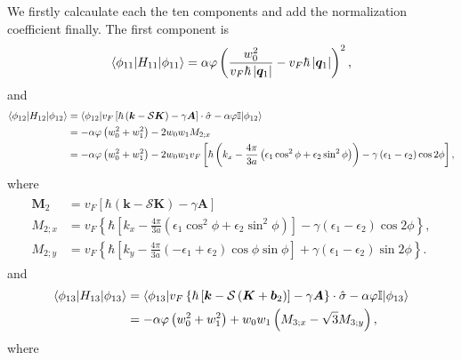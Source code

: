\documentclass[10pt, oneside]{article}
\newcommand{\vph}{\varphi}
\newcommand{\p}[1]{\left(#1\right)}
\newcommand{\bb}[1]{\left[#1\right]}
\newcommand{\br}[1]{\left\{#1\right\}}
\newcommand{\bv}[1]{\left|#1\right|}
\begin{document}
We firstly calcaulate each the ten components and add the normalization coefficient finally. The first component is
\begin{align}
	\begin{split}
		\braket{\phi_{11} | H_{11} | \phi_{11}} = \alpha \vph \p{\frac{w_0^{2}}{v_{F} \hbar \bv{\bm{q}_1}} - v_F \hbar \bv{\bm{q}_{1}}}^2,
	\end{split}
\end{align}
and 
\begin{align}
	\begin{split}
		\braket{\phi_{12} | H_{12} | \phi_{12}} & = \braket{\phi_{12} | v_{F} \bb{\hbar \p{\bm{k} - \mathcal{S} \bm{K}} - \gamma \bm{A}} \cdot \hat{\sigma}  - \alpha \vph \mathbb{I}| \phi_{12}} \\
		& = - \alpha \vph \p{w_0^2 + w_1^2} -2 w_0 w_1 M_{2;x} \\
		& = - \alpha \vph \p{w_{0}^2 + w_{1}^{2}} - 2 w_0 w_1 v_F \bb{\hbar \p{k_{x} - \frac{4 \pi}{3 a} \p{\epsilon_{1} \cos^{2} \phi + \epsilon_{2} \sin^{2} \phi }} - \gamma \p{\epsilon_{1} - \epsilon_{2}} \cos{2 \phi}},
	\end{split}
\end{align}
where 
\begin{align}
	\begin{split}
		\bm{M}_{2} & = v_{F} \bb{\hbar \p{\bm{k} - \mathcal{S} \bm{K}} - \gamma \bm{A}} \\
		M_{2;x} & = v_{F} \br{\hbar \bb{k_{x} - \frac{4 \pi}{3 a} \p{\epsilon_{1} \cos^2 \phi + \epsilon_{2} \sin^2 \phi}} - \gamma \p{\epsilon_{1} - \epsilon_{2}}\cos{2 \phi}}, \\
		M_{2;y} & = v_{F} \br{\hbar \bb{k_{y} - \frac{4 \pi}{3 a} \p{-\epsilon_{1} + \epsilon_{2}}\cos{\phi} \sin{\phi} } + \gamma \p{\epsilon_{1} - \epsilon_{2}} \sin{2 \phi}}.
	\end{split}
\end{align}
and 
\begin{align}
	\begin{split}
		\braket{\phi_{13} | H_{13} | \phi_{13}} &= \braket{\phi_{13} |v_{F} \br{\hbar \bb{\bm{k} - \mathcal{S} \p{\bm{K} + \bm{b}_{2}}} - \gamma \bm{A}} \cdot \hat{\sigma} - \alpha \vph \mathbb{I} | \phi_{13} } \\
		& = - \alpha \vph \p{w_0^2 + w_1^2} + w_0 w_1 \p{M_{3;x} - \sqrt{3} M_{3;y}},
	\end{split}
\end{align}
where
\end{document}
